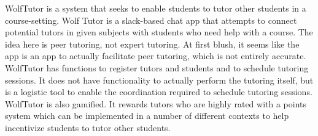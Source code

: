 WolfTutor is a system that seeks to enable students to tutor other
students in a course-setting.  Wolf Tutor is a slack-based chat app
that attempts to connect potential tutors in given subjects with
students who need help with a course.  The idea here is peer tutoring,
not expert tutoring.  At first blush, it seems like the app is an app
to actually facilitate peer tutoring, which is not entirely accurate.
WolfTutor has functions to register tutors and students and to
schedule tutoring sessions.  It does not have functionality to
actually perform the tutoring itself, but is a logistic tool to enable
the coordination required to schedule tutoring sessions.  WolfTutor is
also gamified.  It rewards tutors who are highly rated with a points
system which can be implemented in a number of different contexts to
help incentivize students to tutor other students.
